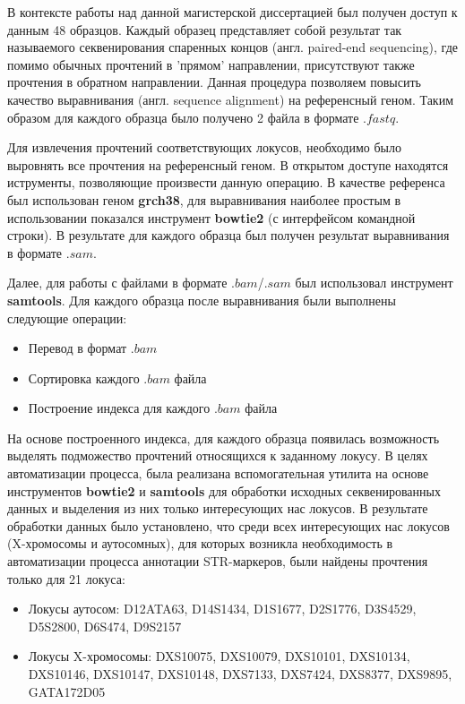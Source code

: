 В контексте работы над данной магистерской диссертацией был получен доступ к данным 48 образцов.
Каждый образец представляет собой результат так называемого секвенирования спаренных концов
(англ. paired-end sequencing), где помимо обычных прочтений в 'прямом' направлении,
присутствуют также прочтения в обратном направлении. Данная процедура позволяем повысить качество
выравнивания (англ. sequence alignment) на референсный геном. Таким образом для каждого
образца было получено 2 файла в формате $.fastq$.

Для извлечения прочтений соответствующих локусов, необходимо было выровнять все прочтения на референсный геном.
В открытом доступе находятся иструменты, позволяющие произвести данную операцию.
В качестве референса был использован геном \textbf{grch38}, для выравнивания наиболее
простым в использовании показался инструмент \textbf{bowtie2} (с интерфейсом командной строки).
В результате для каждого образца был получен результат выравнивания в формате $.sam$.

Далее, для работы с файлами в формате $.bam$/$.sam$ был использовал инструмент \textbf{samtools}.
Для каждого образца после выравнивания были выполнены следующие операции:
\begin{itemize}
\item Перевод в формат $.bam$
\item Сортировка каждого $.bam$ файла
\item Построение индекса для каждого $.bam$ файла
\end{itemize}

На основе построенного индекса, для каждого образца появилась возможность выделять подможество
прочтений относящихся к заданному локусу. В целях автоматизации процесса, была реализана
вспомогательная утилита на основе инструментов \textbf{bowtie2} и \textbf{samtools} для
обработки исходных секвенированных данных и выделения из них только интересующих нас локусов.
В результате обработки данных было установлено, что среди всех интересующих нас локусов
(X-хромосомы и аутосомных), для которых возникла необходимость в автоматизации процесса аннотации
STR-маркеров, были найдены прочтения только для 21 локуса:
\begin{itemize}
\item Локусы аутосом: D12ATA63, D14S1434, D1S1677, D2S1776, D3S4529, D5S2800, D6S474, D9S2157
\item Локусы X-хромосомы: DXS10075, DXS10079, DXS10101, DXS10134, DXS10146, DXS10147, DXS10148, DXS7133, DXS7424, DXS8377, DXS9895, GATA172D05
\end{itemize}

